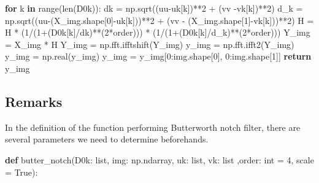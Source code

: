 \documentclass[
]{article}
\newenvironment{Shaded}{}{}
\newcommand{\BuiltInTok}[1]{\textcolor[rgb]{0.00,0.50,0.00}{#1}}
\newcommand{\ControlFlowTok}[1]{\textcolor[rgb]{0.00,0.44,0.13}{\textbf{#1}}}
\newcommand{\DecValTok}[1]{\textcolor[rgb]{0.25,0.63,0.44}{#1}}
\newcommand{\KeywordTok}[1]{\textcolor[rgb]{0.00,0.44,0.13}{\textbf{#1}}}
\newcommand{\NormalTok}[1]{#1}
\newcommand{\OperatorTok}[1]{\textcolor[rgb]{0.40,0.40,0.40}{#1}}
\newcommand{\VariableTok}[1]{\textcolor[rgb]{0.10,0.09,0.49}{#1}}
\begin{document}
\begin{Shaded}
\begin{Highlighting}[]
    \ControlFlowTok{for}\NormalTok{ k }\KeywordTok{in} \BuiltInTok{range}\NormalTok{(}\BuiltInTok{len}\NormalTok{(D0k)):}
\NormalTok{        dk }\OperatorTok{=}\NormalTok{ np.sqrt((uu}\OperatorTok{{-}}\NormalTok{uk[k])}\OperatorTok{**}\DecValTok{2} \OperatorTok{+}\NormalTok{ (vv }\OperatorTok{{-}}\NormalTok{vk[k])}\OperatorTok{**}\DecValTok{2}\NormalTok{)}
\NormalTok{        d\_k }\OperatorTok{=}\NormalTok{ np.sqrt((uu}\OperatorTok{{-}}\NormalTok{(X\_img.shape[}\DecValTok{0}\NormalTok{]}\OperatorTok{{-}}\NormalTok{uk[k]))}\OperatorTok{**}\DecValTok{2} \OperatorTok{+}\NormalTok{ (vv }\OperatorTok{{-}}\NormalTok{ (X\_img.shape[}\DecValTok{1}\NormalTok{]}\OperatorTok{{-}}\NormalTok{vk[k]))}\OperatorTok{**}\DecValTok{2}\NormalTok{)}
\NormalTok{        H }\OperatorTok{=}\NormalTok{ H }\OperatorTok{*}\NormalTok{ (}\DecValTok{1}\OperatorTok{/}\NormalTok{(}\DecValTok{1}\OperatorTok{+}\NormalTok{(D0k[k]}\OperatorTok{/}\NormalTok{dk)}\OperatorTok{**}\NormalTok{(}\DecValTok{2}\OperatorTok{*}\NormalTok{order))) }\OperatorTok{*}\NormalTok{ (}\DecValTok{1}\OperatorTok{/}\NormalTok{(}\DecValTok{1}\OperatorTok{+}\NormalTok{(D0k[k]}\OperatorTok{/}\NormalTok{d\_k)}\OperatorTok{**}\NormalTok{(}\DecValTok{2}\OperatorTok{*}\NormalTok{order)))}
\NormalTok{    Y\_img }\OperatorTok{=}\NormalTok{ X\_img }\OperatorTok{*}\NormalTok{ H}
\NormalTok{    Y\_img }\OperatorTok{=}\NormalTok{ np.fft.ifftshift(Y\_img)}
\NormalTok{    y\_img }\OperatorTok{=}\NormalTok{ np.fft.ifft2(Y\_img)}
\NormalTok{    y\_img }\OperatorTok{=}\NormalTok{ np.real(y\_img)}
\NormalTok{    y\_img }\OperatorTok{=}\NormalTok{ y\_img[}\DecValTok{0}\NormalTok{:img.shape[}\DecValTok{0}\NormalTok{], }\DecValTok{0}\NormalTok{:img.shape[}\DecValTok{1}\NormalTok{]]}
    \ControlFlowTok{return}\NormalTok{ y\_img}
\end{Highlighting}
\end{Shaded}

\hypertarget{remarks-2}{%
\subsection{Remarks}\label{remarks-2}}

In the definition of the function performing Butterworth notch filter,
there are several parameters we need to determine beforehands.

\begin{Shaded}
\begin{Highlighting}[]
\KeywordTok{def}\NormalTok{ butter\_notch(D0k: }\BuiltInTok{list}\NormalTok{, img: np.ndarray, uk: }\BuiltInTok{list}\NormalTok{, vk: }\BuiltInTok{list}\NormalTok{ ,order: }\BuiltInTok{int} \OperatorTok{=} \DecValTok{4}\NormalTok{, scale }\OperatorTok{=} \VariableTok{True}\NormalTok{):}
\end{Highlighting}
\end{Shaded}
\end{document}
